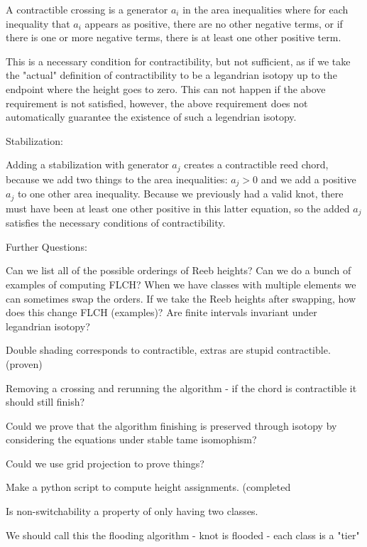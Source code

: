 \documentclass[11pt]{amsart}
\begin{document}
A contractible crossing is a generator $a_i$ in the area inequalities where for each inequality that $a_i$ appears as positive, there are no other negative terms, or if there is one or more negative terms, there is at least one other positive term.

This is a necessary condition for contractibility, but not sufficient, as if we take the "actual" definition of contractibility to be a legandrian isotopy up to the endpoint where the height goes to zero. This can not happen if the above requirement is not satisfied, however, the above requirement does not automatically guarantee the existence of such a legendrian isotopy. 


Stabilization:

Adding a stabilization with generator $a_j$ creates a contractible reed chord, because we add two things to the area inequalities: $a_j>0$ and we add a positive $a_j$ to one other area inequality. Because we previously had a valid knot, there must have been at least one other positive in this latter equation, so the added $a_j$ satisfies the necessary conditions of contractibility. 




Further Questions:



Can we list all of the possible orderings of Reeb heights?
Can we do a bunch of examples of computing FLCH?
When we have classes with multiple elements we can sometimes swap the orders. If we take the Reeb heights after swapping, how does this change FLCH (examples)?
Are finite intervals invariant under legandrian isotopy?

Double shading corresponds to contractible, extras are stupid contractible. (proven)


Removing a crossing and rerunning the algorithm - if the chord is contractible it should still finish?

Could we prove that the algorithm finishing is preserved through isotopy by considering the equations under stable tame isomophism?

Could we use grid projection to prove things?

Make a python script to compute height assignments. (completed


Is non-switchability a property of only having two classes.


We should call this the flooding algorithm - knot is flooded  - each class is a "tier" 
\newline
\end{document}
